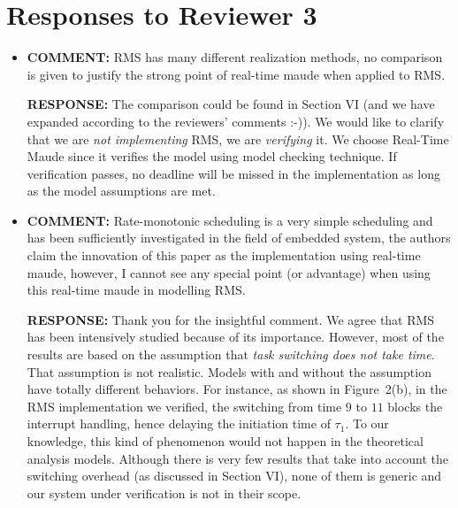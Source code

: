 \documentclass[10pt,journal]{IEEEtran}
\newcommand{\hide}[1]{\ignorespaces}
\newcommand{\ANSWER}{{\bf RESPONSE: }}
\newcommand{\COMMENT}{{\bf COMMENT: }}
\begin{document}
\section{Responses to Reviewer 3}
\begin{itemize}
\item
\COMMENT RMS has many different realization methods, no comparison is
given to justify the strong point of real-time maude when applied to
RMS.

\ANSWER The comparison could be found in Section VI (and we have
expanded according to the reviewers' comments :-)). We would like to
clarify that we are \emph{not implementing} RMS, we are
\emph{verifying} it. We choose Real-Time Maude since it verifies the
model using model checking technique. If verification passes, no
deadline will be missed in the implementation as long as the model
assumptions are met.

\hide{
The comparison is given in the related work section (Section
VI). We would say that we are not implementing RMS algorithm in
Real-Time Maude. In fact, we are using Real-Time Maude to model an
realistic implementation of RMS from an industrial avionic
system. There is no theoretical reason telling us that we have to use
Real-Time Maude to model the RMS implementation. However, the existing
verification work as far as we know cannot fit our needs, as discussed
in Section VI. Therefore, we developed the work in the paper, as a
piece of real work in the industry.
}

\item
\COMMENT Rate-monotonic scheduling is a very simple scheduling and has
been sufficiently investigated in the field of embedded system, the
authors claim the innovation of this paper as the implementation using
real-time maude, however, I cannot see any special point (or
advantage) when using this real-time maude in modelling RMS.

\ANSWER Thank you for the insightful comment. We agree that RMS has
been intensively studied because of its importance. However, most of
the results are based on the assumption that \emph{task switching does
  not take time}. That assumption is not realistic. Models with and
without the assumption have totally different behaviors. For instance,
as shown in Figure~2(b), in the RMS implementation we verified, the
switching from time $9$ to $11$ blocks the interrupt handling, hence
delaying the initiation time of $\tau_1$. To our knowledge, this kind
of phenomenon would not happen in the theoretical analysis
models. Although there is very few results that take into account the
switching overhead (as discussed in Section VI), none of them is
generic and our system under verification is not in their scope.


\end{itemize}
\end{document}
